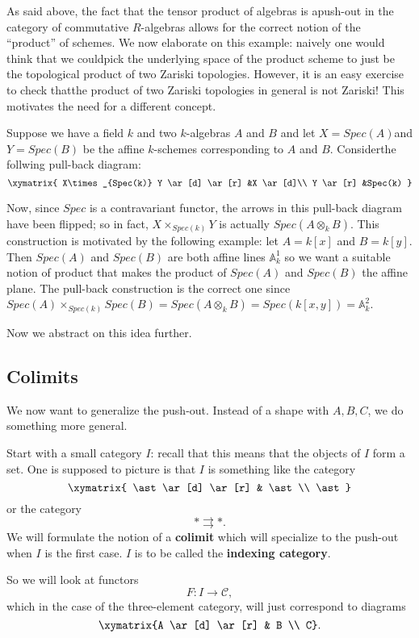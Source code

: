 \begin{example} As said above, the fact that the tensor product of algebras is
apush-out in the category of
commutative $R$-algebras allows for the correct notion of the ``product'' of
schemes. We now elaborate on this example: naively one would think that we
couldpick the underlying space of the product scheme to just be the topological
product of two Zariski topologies. However, it is an easy exercise to check
thatthe product of two Zariski topologies in general is not Zariski! This
motivates
the need for a different concept.

Suppose we have a field $k$ and two $k$-algebras $A$ and $B$ and let
$X=Spec(A)$and $Y=Spec(B)$ be the affine $k$-schemes corresponding to $A$ and
$B$. Considerthe follwing pull-back diagram:
\[
\xymatrix{
X\times_{Spec(k)} Y \ar[d] \ar[r] &X \ar[d]\\
Y \ar[r] &Spec(k) }\]

Now, since $Spec$ is a contravariant functor, the arrows in this pull-back
diagram have been flipped; so in fact, $X\times_{Spec(k)} Y$ is actually
$Spec(A\otimes _k B)$. This construction is motivated by the following example:
let $A=k[x]$ and $B=k[y]$. Then $Spec(A)$ and $Spec(B)$ are both affine lines
$\mathbb{A}^1_k$ so we want a suitable notion of product that makes the product
of $Spec(A)$ and $Spec(B)$ the affine plane. The pull-back construction is the
correct one since $Spec(A)\times_{Spec(k)} Spec(B)=Spec(A\otimes_k
B)=Spec(k[x,y])=\mathbb{A}^2_k$.
\end{example}

Now we abstract on this idea further.

\subsection{Colimits}


We now want to generalize the push-out.
Instead of a shape with $A,B,C$, we do something more general.

Start with a small category $I$: recall that this means that the objects of $I$
form a set. One is supposed to picture
is that $I$ is something like the category
\[
\xymatrix{
\ast \ar[d] \ar[r] &  \ast \\
\ast
}
\]
or the category
\[ \ast \rightrightarrows \ast.  \]
We will formulate the notion of a \textbf{colimit} which will specialize to the
push-out when $I$ is the first case. $I$ is to be called  the  \textbf{indexing
category}.


So we will look at functors
\[ F: I \to \mathcal{C},  \]
which in the case of the three-element category, will just
 correspond to
diagrams
\[ \xymatrix{A \ar[d]  \ar[r] &  B \\ C}.  \]


